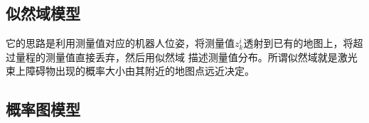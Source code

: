 \documentclass[10pt]{article}
\begin{document}
\subsection{似然域模型}
它的思路是利用测量值对应的机器人位姿，将测量值$z_{k}^{i}$透射到已有的地图上，将超过量程的测量值直接丢弃，然后用似然域
描述测量值分布。所谓似然域就是激光束上障碍物出现的概率大小由其附近的地图点远近决定。
\subsection{概率图模型}
\end{document}
